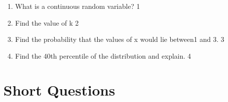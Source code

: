 \documentclass[a4paper,oneside, margin=1.4in]{book}
\begin{document}
\begin{enumerate}
  \begin{enumerate}
    \item
	What is a continuous random variable? \hfill 1
    \item
    	Find the value of k \hfill 2
    \item
    	Find the probability that the values of x would lie between1 and 3. \hfill 3
     \item
     	Find the 40th percentile of the distribution and explain.  \hfill 4
  \end{enumerate}
  \end{enumerate}

\section{Short Questions}
\end{document}
